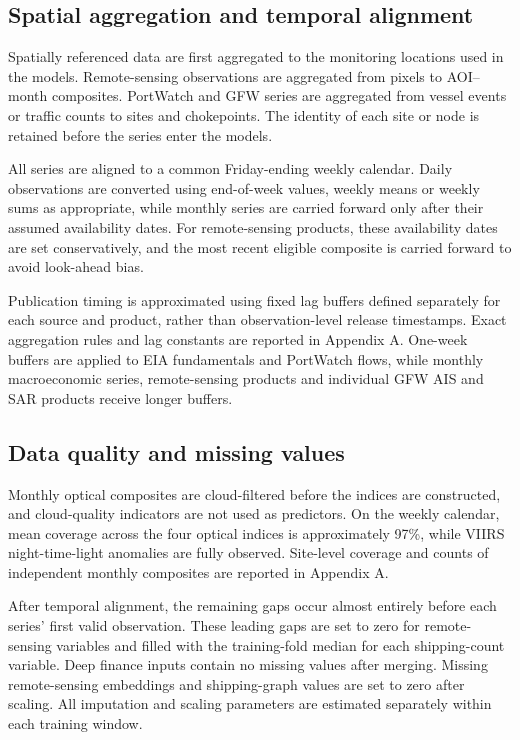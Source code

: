 \documentclass[
  british,
  12pt,
  oneside]{book}
\begin{document}
\subsection{Spatial aggregation and temporal alignment}\label{method-alignment}

Spatially referenced data are first aggregated to the monitoring locations used in the models. Remote-sensing observations are aggregated from pixels to AOI--month composites. PortWatch and GFW series are aggregated from vessel events or traffic counts to sites and chokepoints. The identity of each site or node is retained before the series enter the models.

All series are aligned to a common Friday-ending weekly calendar. Daily observations are converted using end-of-week values, weekly means or weekly sums as appropriate, while monthly series are carried forward only after their assumed availability dates. For remote-sensing products, these availability dates are set conservatively, and the most recent eligible composite is carried forward to avoid look-ahead bias.

Publication timing is approximated using fixed lag buffers defined separately for each source and product, rather than observation-level release timestamps. Exact aggregation rules and lag constants are reported in Appendix A. One-week buffers are applied to EIA fundamentals and PortWatch flows, while monthly macroeconomic series, remote-sensing products and individual GFW AIS and SAR products receive longer buffers.

\subsection{Data quality and missing values}\label{method-missing}

Monthly optical composites are cloud-filtered before the indices are constructed, and cloud-quality indicators are not used as predictors. On the weekly calendar, mean coverage across the four optical indices is approximately 97\%, while VIIRS night-time-light anomalies are fully observed. Site-level coverage and counts of independent monthly composites are reported in Appendix A.

After temporal alignment, the remaining gaps occur almost entirely before each series' first valid observation. These leading gaps are set to zero for remote-sensing variables and filled with the training-fold median for each shipping-count variable. Deep finance inputs contain no missing values after merging. Missing remote-sensing embeddings and shipping-graph values are set to zero after scaling. All imputation and scaling parameters are estimated separately within each training window.
\end{document}
